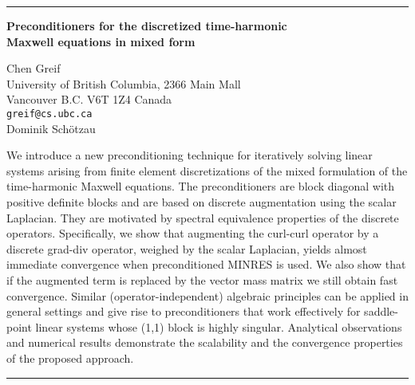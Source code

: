 \documentclass[twosided]{report}
\begin{document}
	\begin{center} \rule{6in}{1pt} \end{center}

\begin{center}
{\large			%
{\bf Preconditioners for the discretized time-harmonic \\
Maxwell equations in mixed form}}

	Chen Greif \\
	University of British Columbia, 2366 Main Mall \\
	Vancouver B.C.  V6T 1Z4 Canada \\
	{\tt greif@cs.ubc.ca} \\
	Dominik Sch\"otzau
\end{center}
We introduce a new preconditioning technique for iteratively
solving linear systems arising from finite element
discretizations of the mixed formulation of the
time-harmonic Maxwell equations. The preconditioners are
block diagonal with positive definite blocks and are based
on discrete augmentation using the scalar Laplacian. They
are motivated by spectral equivalence properties of the
discrete operators. Specifically, we show that augmenting
the curl-curl operator by a discrete grad-div operator,
weighed by the scalar Laplacian, yields almost immediate
convergence when preconditioned MINRES is used. We also show
that if the augmented term is replaced by the vector mass
matrix we still obtain fast convergence. Similar
(operator-independent) algebraic principles can be applied
in general settings and give rise to preconditioners that
work effectively for saddle-point linear systems whose (1,1)
block is highly singular. Analytical observations and
numerical results demonstrate the scalability and the
convergence properties of the proposed approach.



	\begin{center} \rule{6in}{1pt} \end{center}
\end{document}
